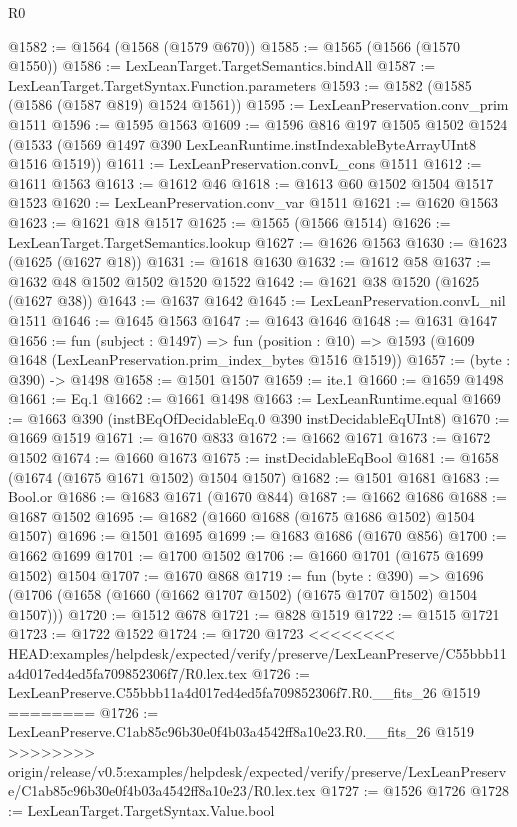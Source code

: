 \begin{lexlean}{R0}
\begin{coremodule}
{{{{{{{{{{{{{{{{{{{{{{{{{{{{{{{{{{{{{{{{{{{{{{{{{{{{{{{{{{{{{{{{{{{{{{{{{@1582 := @1564 (@1568 (@1579 @670))
@1585 := @1565 (@1566 (@1570 @1550))
@1586 := LexLeanTarget.TargetSemantics.bindAll
@1587 := LexLeanTarget.TargetSyntax.Function.parameters
@1593 := @1582 (@1585 (@1586 (@1587 @819) @1524 @1561))
@1595 := LexLeanPreservation.conv_prim @1511
@1596 := @1595 @1563
@1609 := @1596
    @816
    @197
    @1505
    @1502
    @1524
    (@1533 (@1569 @1497 @390 LexLeanRuntime.instIndexableByteArrayUInt8 @1516 @1519))
@1611 := LexLeanPreservation.convL_cons @1511
@1612 := @1611 @1563
@1613 := @1612 @46
@1618 := @1613 @60 @1502 @1504 @1517 @1523
@1620 := LexLeanPreservation.conv_var @1511
@1621 := @1620 @1563
@1623 := @1621 @18 @1517
@1625 := @1565 (@1566 @1514)
@1626 := LexLeanTarget.TargetSemantics.lookup
@1627 := @1626 @1563
@1630 := @1623 (@1625 (@1627 @18))
@1631 := @1618 @1630
@1632 := @1612 @58
@1637 := @1632 @48 @1502 @1502 @1520 @1522
@1642 := @1621 @38 @1520 (@1625 (@1627 @38))
@1643 := @1637 @1642
@1645 := LexLeanPreservation.convL_nil @1511
@1646 := @1645 @1563
@1647 := @1643 @1646
@1648 := @1631 @1647
@1656 := fun (subject : @1497) =>
  fun (position : @10) => @1593 (@1609 @1648 (LexLeanPreservation.prim_index_bytes @1516 @1519))
@1657 := (byte : @390) -> @1498
@1658 := @1501 @1507
@1659 := ite.{1}
@1660 := @1659 @1498
@1661 := Eq.{1}
@1662 := @1661 @1498
@1663 := LexLeanRuntime.equal
@1669 := @1663 @390 (instBEqOfDecidableEq.{0} @390 instDecidableEqUInt8)
@1670 := @1669 @1519
@1671 := @1670 @833
@1672 := @1662 @1671
@1673 := @1672 @1502
@1674 := @1660 @1673
@1675 := instDecidableEqBool
@1681 := @1658 (@1674 (@1675 @1671 @1502) @1504 @1507)
@1682 := @1501 @1681
@1683 := Bool.or
@1686 := @1683 @1671 (@1670 @844)
@1687 := @1662 @1686
@1688 := @1687 @1502
@1695 := @1682 (@1660 @1688 (@1675 @1686 @1502) @1504 @1507)
@1696 := @1501 @1695
@1699 := @1683 @1686 (@1670 @856)
@1700 := @1662 @1699
@1701 := @1700 @1502
@1706 := @1660 @1701 (@1675 @1699 @1502) @1504
@1707 := @1670 @868
@1719 := fun (byte : @390) =>
  @1696 (@1706 (@1658 (@1660 (@1662 @1707 @1502) (@1675 @1707 @1502) @1504 @1507)))
@1720 := @1512 @678
@1721 := @828 @1519
@1722 := @1515 @1721
@1723 := @1722 @1522
@1724 := @1720 @1723
<<<<<<<< HEAD:examples/helpdesk/expected/verify/preserve/LexLeanPreserve/C55bbb11a4d017ed4ed5fa709852306f7/R0.lex.tex
@1726 := LexLeanPreserve.C55bbb11a4d017ed4ed5fa709852306f7.R0.__fits_26 @1519
========
@1726 := LexLeanPreserve.C1ab85c96b30e0f4b03a4542ff8a10e23.R0.__fits_26 @1519
>>>>>>>> origin/release/v0.5:examples/helpdesk/expected/verify/preserve/LexLeanPreserve/C1ab85c96b30e0f4b03a4542ff8a10e23/R0.lex.tex
@1727 := @1526 @1726
@1728 := LexLeanTarget.TargetSyntax.Value.bool
}}}}}}}}}}}}}}}}}}}}}}}}}}}}}}}}}}}}}}}}}}}}}}}}}}}}}}}}}}}}}}}}}}}}}}}}}
\end{coremodule}
\end{lexlean}
